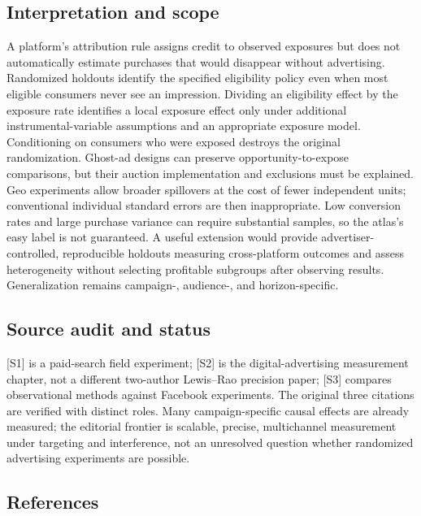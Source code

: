 \documentclass[11pt,a4paper]{article}
\begin{document}
\subsection*{Interpretation and scope}

A platform's attribution rule assigns credit to observed exposures but does not automatically estimate purchases that would disappear without advertising. Randomized holdouts identify the specified eligibility policy even when most eligible consumers never see an impression. Dividing an eligibility effect by the exposure rate identifies a local exposure effect only under additional instrumental-variable assumptions and an appropriate exposure model. Conditioning on consumers who were exposed destroys the original randomization. Ghost-ad designs can preserve opportunity-to-expose comparisons, but their auction implementation and exclusions must be explained. Geo experiments allow broader spillovers at the cost of fewer independent units; conventional individual standard errors are then inappropriate. Low conversion rates and large purchase variance can require substantial samples, so the atlas's easy label is not guaranteed. A useful extension would provide advertiser-controlled, reproducible holdouts measuring cross-platform outcomes and assess heterogeneity without selecting profitable subgroups after observing results. Generalization remains campaign-, audience-, and horizon-specific.

\subsection*{Source audit and status}

[S1] is a paid-search field experiment; [S2] is the digital-advertising measurement chapter, not a different two-author Lewis--Rao precision paper; [S3] compares observational methods against Facebook experiments. The original three citations are verified with distinct roles. Many campaign-specific causal effects are already measured; the editorial frontier is scalable, precise, multichannel measurement under targeting and interference, not an unresolved question whether randomized advertising experiments are possible.

\subsection*{References}
\end{document}
